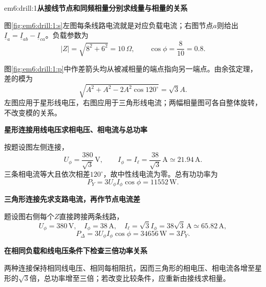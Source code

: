 \begin{drillsolution}{em6:drill:1}\textbf{从接线节点和同频相量分别求线量与相量的关系}\par\nobreak
图\ref{fig:em6:drill:1:s}左图每条线路电流就是对应负载电流；右图节点$a$则给出$\underline I_a=\underline I_{ab}-\underline I_{ca}$。负载参数为
\[
 |Z|=\sqrt{8^2+6^2}=10\,\Omega,\qquad \cos\phi=\frac8{10}=0.8.
\]

图\ref{fig:em6:drill:1:p}中作差箭头均从被减相量的端点指向另一端点。由余弦定理，差的模为
\[
 \sqrt{A^2+A^2-2A^2\cos120^\circ}=\sqrt3A.
\]
左图应用于星形线电压，右图应用于三角形线电流；两幅相量图可各自整体旋转，不改变模的关系。

\par\medskip{}\noindent

\par\medskip{}\noindent\textbf{星形连接用线电压求相电压、相电流与总功率}\par\nobreak
按题设图左侧连接，
\[
 U_\phi=\frac{380}{\sqrt3}\,\mathrm V,\qquad
 I_\phi=I_\ell=\frac{38}{\sqrt3}\,\mathrm A
              \simeq21.94\,\mathrm A.
\]
三条相电流等大且依次相差$120^\circ$，故中性线电流为零。总有功功率为
\[
 P_Y=3U_\phi I_\phi\cos\phi=11552\,\mathrm W.
\]

\par\medskip{}\noindent

\par\medskip{}\noindent\textbf{三角形连接先求支路电流，再作节点电流差}\par\nobreak
题设图右侧每个$Z$直接跨接两条线路，
\[
 U_\phi=380\,\mathrm V,\quad I_\phi=38\,\mathrm A,\quad
 I_\ell=\sqrt3I_\phi=38\sqrt3\,\mathrm A\simeq65.82\,\mathrm A,
\]
\[
 P_\Delta=3U_\phi I_\phi\cos\phi=34656\,\mathrm W=3P_Y.
\]


\par\medskip{}\noindent\textbf{在相同负载和线电压条件下检查三倍功率关系}\par\nobreak
两种连接保持相同线电压、相同每相阻抗，因而三角形的相电压、相电流各增至星形的$\sqrt3$倍，总功率增至三倍；若改变比较条件，应重新由接线求相量。
\end{drillsolution}
